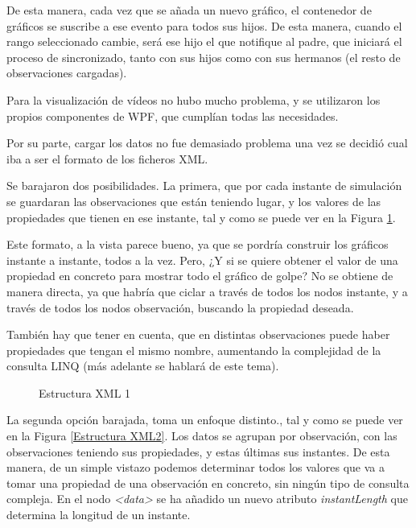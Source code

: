 De esta manera, cada vez que se a\~nada un nuevo gr\'afico, el contenedor de gr\'aficos se suscribe a ese evento para todos
sus hijos. De esta manera, cuando el rango seleccionado cambie, ser\'a ese hijo el que notifique al padre, que iniciar\'a
el proceso de sincronizado, tanto con sus hijos como con sus hermanos (el resto de observaciones cargadas).

Para la visualizaci\'on de v\'ideos no hubo mucho problema, y se utilizaron los
propios componentes de WPF, que cumpl\'ian todas las necesidades.

Por su parte, cargar los datos no fue demasiado problema una vez se decidi\'o cual iba a ser el formato de los
ficheros XML.

Se barajaron dos posibilidades. La primera, que por cada instante de simulaci\'on se guardaran las observaciones
que est\'an teniendo lugar, y los valores de las propiedades que tienen en ese instante, tal y como
se puede ver en la Figura \ref{Estructura XML1}.

Este formato, a la vista parece bueno, ya que se pordr\'ia construir los gr\'aficos instante a instante,
todos a la vez. Pero, ¿Y si se quiere obtener el valor de una propiedad en concreto para mostrar todo 
el gr\'afico de golpe? No se obtiene de manera directa, ya que habr\'ia que ciclar a trav\'es de todos los nodos
instante, y a trav\'es de todos los nodos observaci\'on, buscando la propiedad deseada.

Tambi\'en hay que tener en cuenta, que en distintas observaciones puede haber propiedades que tengan el mismo nombre, 
aumentando la complejidad de la consulta LINQ (m\'as adelante se hablar\'a de este tema).

\begin{figure}[h]
    
    \caption[Estructura XML 1]{Estructura XML 1}
    \label{Estructura XML1}
\end{figure}

La segunda opci\'on barajada, toma un enfoque distinto., tal y como se puede
ver en la Figura \ref{Estructura XML2}. Los datos se agrupan por observaci\'on, con las observaciones teniendo sus propiedades,
y estas \'ultimas sus instantes. De esta manera, de un simple vistazo podemos determinar todos los valores que va a tomar
una propiedad de una observaci\'on en concreto, sin ning\'un tipo de consulta compleja.
En el nodo \emph{<data>} se ha a\~{n}adido un nuevo atributo \emph{instantLength} que 
determina la longitud de un instante.

